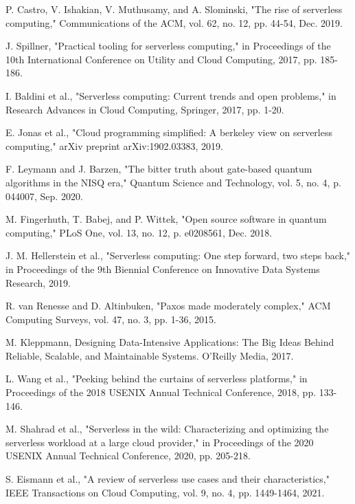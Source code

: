 \documentclass[onecolumn]{IEEEtran}
\begin{document}
\begin{thebibliography}{15}
P. Castro, V. Ishakian, V. Muthusamy, and A. Slominski, "The rise of serverless computing," Communications of the ACM, vol. 62, no. 12, pp. 44-54, Dec. 2019.

J. Spillner, "Practical tooling for serverless computing," in Proceedings of the 10th International Conference on Utility and Cloud Computing, 2017, pp. 185-186.

I. Baldini et al., "Serverless computing: Current trends and open problems," in Research Advances in Cloud Computing, Springer, 2017, pp. 1-20.

E. Jonas et al., "Cloud programming simplified: A berkeley view on serverless computing," arXiv preprint arXiv:1902.03383, 2019.

F. Leymann and J. Barzen, "The bitter truth about gate-based quantum algorithms in the NISQ era," Quantum Science and Technology, vol. 5, no. 4, p. 044007, Sep. 2020.

M. Fingerhuth, T. Babej, and P. Wittek, "Open source software in quantum computing," PLoS One, vol. 13, no. 12, p. e0208561, Dec. 2018.

J. M. Hellerstein et al., "Serverless computing: One step forward, two steps back," in Proceedings of the 9th Biennial Conference on Innovative Data Systems Research, 2019.

R. van Renesse and D. Altinbuken, "Paxos made moderately complex," ACM Computing Surveys, vol. 47, no. 3, pp. 1-36, 2015.

M. Kleppmann, Designing Data-Intensive Applications: The Big Ideas Behind Reliable, Scalable, and Maintainable Systems. O'Reilly Media, 2017.

L. Wang et al., "Peeking behind the curtains of serverless platforms," in Proceedings of the 2018 USENIX Annual Technical Conference, 2018, pp. 133-146.

M. Shahrad et al., "Serverless in the wild: Characterizing and optimizing the serverless workload at a large cloud provider," in Proceedings of the 2020 USENIX Annual Technical Conference, 2020, pp. 205-218.

S. Eismann et al., "A review of serverless use cases and their characteristics," IEEE Transactions on Cloud Computing, vol. 9, no. 4, pp. 1449-1464, 2021.


\end{thebibliography}
\end{document}
